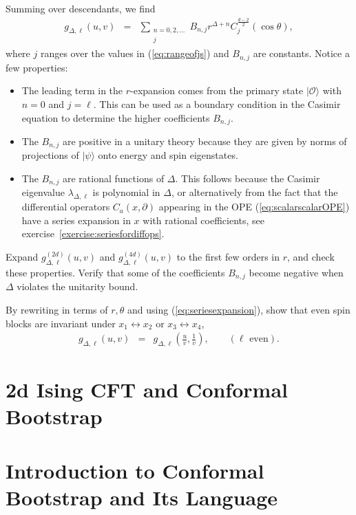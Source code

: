 \documentclass[12pt]{article}
\numberwithin{equation}{section}
\newcommand\be{\begin{eqnarray}}
\newcommand\ee{\end{eqnarray}}
\newcommand\cO{\mathcal{O}}
\newcommand\p[1]{\left(#1\right)}
\newcommand\ptl\partial
\newcommand\<\langle
\renewcommand\>\rangle
\renewcommand\.{\cdot}
\newcommand\De{\Delta}
\renewcommand\l\lambda
\renewcommand\th{\theta}
\begin{document}
Summing over descendants, we find
\be
\label{eq:seriesexpansion}
g_{\De,\ell}(u,v) &=& \sum_{\substack{n=0,2,\dots \\ j}} B_{n,j}r^{\De+n}C_j^{\frac{d-2}{2}}(\cos\th),\label{eq:seriesforblock}
\ee
where $j$ ranges over the values in (\ref{eq:rangeofjs}) and $B_{n,j}$ are constants.  
Notice a few properties:
\begin{itemize}
\item The leading term in the $r$-expansion comes from the primary state $|\cO\>$ with $n=0$ and $j=\ell$. This can be used as a boundary condition in the Casimir equation to determine the higher coefficients $B_{n,j}$.
\item The $B_{n,j}$ are positive in a unitary theory because they are given by norms of projections of $|\psi\>$ onto energy and spin eigenstates.
\item The $B_{n,j}$ are rational functions of $\De$.  This follows because the Casimir eigenvalue $\l_{\De,\ell}$ is polynomial in $\De$, or alternatively from the fact that the differential operators $C_a(x,\ptl)$ appearing in the OPE (\ref{eq:scalarscalarOPE}) have a series expansion in $x$ with rational coefficients, see exercise~\ref{exercise:seriesfordiffops}. 
\end{itemize}

Expand $g^{(2d)}_{\De,\ell}(u,v)$ and $g^{(4d)}_{\De,\ell}(u,v)$ to the first few orders in $r$, and check these properties.  Verify that some of the coefficients $B_{n,j}$ become negative when $\De$ violates the unitarity bound.

By rewriting in terms of $r,\th$ and using (\ref{eq:seriesexpansion}), show that even spin blocks are invariant under $x_1\leftrightarrow x_2$ or $x_3\leftrightarrow x_4$,
\be
\label{eq:invariantunderonetwo}
g_{\De,\ell}(u,v) &=& g_{\De,\ell}\p{\frac{u}{v},\frac 1 v},\qquad(\textrm{$\ell$ even}).
\ee

\section{2d Ising CFT and Conformal Bootstrap}


\section{Introduction to Conformal Bootstrap and Its Language}
\end{document}
